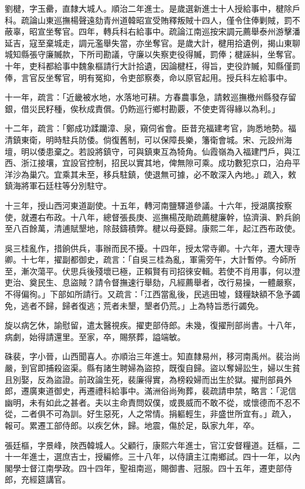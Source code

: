 \begin{pinyinscope}
劉楗，字玉罍，直隸大城人。順治二年進士。是歲選新進士十人授給事中，楗除戶科。疏論山東巡撫楊聲遠劾青州道韓昭宣受賄釋叛賊十四人，僅令住俸剿賊，罰不蔽辜，昭宣坐奪官。四年，轉兵科右給事中。疏論江南巡按宋調元薦舉泰州游擊潘延吉，寇至棄城走，調元濫舉失當，亦坐奪官。是歲大計，楗用拾遺例，揭山東聊城知縣張守廉贓款，下所司勘議，守廉以失察吏役得贓，罰俸；楗誣糾，坐奪官。十年，吏科都給事中魏象樞請行大計拾遺，因論楗枉，得旨，吏役詐贓，知縣僅罰俸，言官反坐奪官，明有冤抑，令吏部察奏，命以原官起用。授兵科左給事中。

十一年，疏言：「近畿被水地，水落地可耕。方春農事急，請敕巡撫檄州縣發存留銀，借災民籽種，俟秋成責償。仍飭巡行鄉村勘覈，不使吏胥得緣以為利。」

十二年，疏言：「鄭成功蹂躪漳、泉，窺伺省會。臣昔充福建考官，詢悉地勢。福清鎮東衛，明時駐兵防倭。倘復舊制，可以保障長樂，籓衛會城。宋、元設州海壇，明以倭患棄之。若設將鎮守，可與鎮東互為犄角。仙霞嶺為入福建門戶，與江西、浙江接壤，宜設官控制，招民以實其地，俾無隙可乘。成功數犯京口，泊舟平洋沙為巢穴。宜乘其未至，移兵駐鎮，使退無可據，必不敢深入內地。」疏入，敕鎮海將軍石廷柱等分別駐守。

十三年，授山西河東道副使。十五年，轉河南鹽驛道參議。十六年，授湖廣按察使，就遷右布政。十八年，總督張長庚、巡撫楊茂勛疏薦楗廉幹，協濟滇、黔兵餉至八百餘萬，清逋賦墾地，除鼓鑄積弊。楗以母憂歸。康熙二年，起江西布政使。

吳三桂亂作，措餉供兵，事辦而民不擾。十四年，授太常寺卿。十六年，遷大理寺卿。十七年，擢副都御史，疏言：「自吳三桂為亂，軍需旁午，大計暫停。今師所至，漸次蕩平。伏思兵後殘壞已極，正賴賢有司招徠安輯。若使不肖用事，何以澄吏治、奠民生、息盜賊？請令督撫速行舉劾，凡經薦舉者，改行易操，一體嚴察，不得偏徇。」下部如所請行。又疏言：「江西當亂後，民逃田墟，錢糧缺額不急予蠲免，逃者不歸，歸者復逃；荒者未墾，墾者仍荒。」上為特旨悉行蠲免。

旋以病乞休，諭慰留，遣太醫視疾。擢吏部侍郎。未幾，復擢刑部尚書。十八年，病劇，始得請還里。至家，卒，賜祭葬，謚端敏。

硃裴，字小晉，山西聞喜人。亦順治三年進士。知直隸易州，移河南禹州。裴治尚嚴，到官即捕殺盜渠。縣有諸生聘婦為盜掠，既復自歸。盜以奪婦訟生，婦以生貧且別娶，反為盜證。前政論生死，裴廉得實，為榜殺婦而出生於獄。擢刑部員外郎，遷廣東道御史，再遷禮科給事中。滿洲俗尚殉葬，裴疏請申禁，略言：「泥信幽明，未有如此之甚者。夫以主命責問奴僕，或畏威而不敢不從，或懷德而不忍不從，二者俱不可為訓。好生惡死，人之常情。捐軀輕生，非盛世所宜有。」疏入，報可。累遷工部侍郎。以疾乞休，歸。地震，傷於足，臥家九年，卒。

張廷樞，字景峰，陜西韓城人。父顧行，康熙六年進士，官江安督糧道。廷樞，二十一年進士，選庶吉士，授編修。三十八年，以侍讀主江南鄉試。四十一年，以內閣學士督江南學政。四十四年，聖祖南巡，賜御書、冠服。四十五年，遷吏部侍郎，充經筵講官。


\end{pinyinscope}

